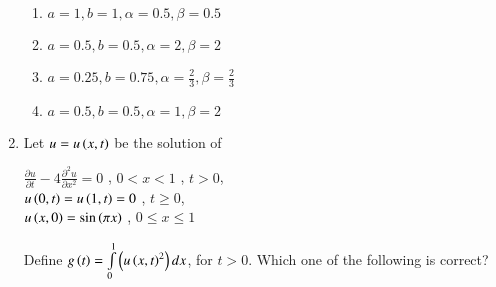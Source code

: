 \documentclass[journal]{IEEEtran}
\begin{document}
\begin{enumerate}
\begin{enumerate}
    \item $a = 1, b = 1, \alpha = 0.5, \beta = 0.5 $
     \item $a = 0.5, b = 0.5, \alpha = 2, \beta = 2 $
      \item $a = 0.25, b = 0.75, \alpha = \frac{2}{3}, \beta = \frac{2}{3}$
       \item $a = 0.5, b = 0.5, \alpha = 1, \beta = 2 $
\end{enumerate}
\item Let $u = u\left(x,t\right)$ be the solution of 
\begin{center}
    $\frac{\partial u}{\partial t} - 4 \frac{\partial^2 u}{\partial x^2} = 0$ , $0 < x < 1$ , $t > 0$, \\
    $u\left(0,t\right) = u\left(1,t\right) = 0$ , $ t \geq 0$, \\
    $u\left(x,0\right) = \sin \left(\pi x\right)$ , $ 0 \leq x \leq 1$ 
\end{center}
Define $g\left(t\right) = \int \limits_0^1 \left(u \left(x,t\right)^2\right) dx$, for $t > 0$. Which one of the following is correct?  


\end{enumerate}
\end{document}

